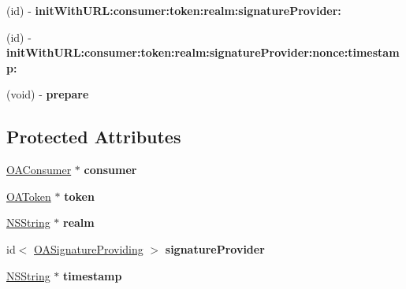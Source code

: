\begin{DoxyCompactItemize}
\item 
\hypertarget{interface_o_a_mutable_u_r_l_request_a788bccbe6575ee223ee198d26abb589e}{
(id) -\/ {\bfseries init\-With\-U\-R\-L\-:consumer\-:token\-:realm\-:signature\-Provider\-:}}
\label{interface_o_a_mutable_u_r_l_request_a788bccbe6575ee223ee198d26abb589e}

\item 
\hypertarget{interface_o_a_mutable_u_r_l_request_a6f3460b9be386fc40bd8ba6995fee771}{
(id) -\/ {\bfseries init\-With\-U\-R\-L\-:consumer\-:token\-:realm\-:signature\-Provider\-:nonce\-:timestamp\-:}}
\label{interface_o_a_mutable_u_r_l_request_a6f3460b9be386fc40bd8ba6995fee771}

\item 
\hypertarget{interface_o_a_mutable_u_r_l_request_a85905a8fd26337bdf3ffe76c118f42b9}{
(void) -\/ {\bfseries prepare}}
\label{interface_o_a_mutable_u_r_l_request_a85905a8fd26337bdf3ffe76c118f42b9}

\end{DoxyCompactItemize}
\subsection*{\-Protected \-Attributes}
\begin{DoxyCompactItemize}
\item 
\hypertarget{interface_o_a_mutable_u_r_l_request_a6446e01c8b0058590b6be383cd2b325c}{
\hyperlink{interface_o_a_consumer}{\-O\-A\-Consumer} $\ast$ {\bfseries consumer}}
\label{interface_o_a_mutable_u_r_l_request_a6446e01c8b0058590b6be383cd2b325c}

\item 
\hypertarget{interface_o_a_mutable_u_r_l_request_aa6c489933569dd855163b5d588b0cec4}{
\hyperlink{interface_o_a_token}{\-O\-A\-Token} $\ast$ {\bfseries token}}
\label{interface_o_a_mutable_u_r_l_request_aa6c489933569dd855163b5d588b0cec4}

\item 
\hypertarget{interface_o_a_mutable_u_r_l_request_afbf63727b2969aae460c8fceb87db811}{
\hyperlink{class_n_s_string}{\-N\-S\-String} $\ast$ {\bfseries realm}}
\label{interface_o_a_mutable_u_r_l_request_afbf63727b2969aae460c8fceb87db811}

\item 
\hypertarget{interface_o_a_mutable_u_r_l_request_a16c7b64611aef098327115199713bc56}{
id$<$ \hyperlink{protocol_o_a_signature_providing-p}{\-O\-A\-Signature\-Providing} $>$ {\bfseries signature\-Provider}}
\label{interface_o_a_mutable_u_r_l_request_a16c7b64611aef098327115199713bc56}

\item 
\hypertarget{interface_o_a_mutable_u_r_l_request_a87431b17c0207003dc0920c2a5781c45}{
\hyperlink{class_n_s_string}{\-N\-S\-String} $\ast$ {\bfseries timestamp}}
\label{interface_o_a_mutable_u_r_l_request_a87431b17c0207003dc0920c2a5781c45}

\end{DoxyCompactItemize}
